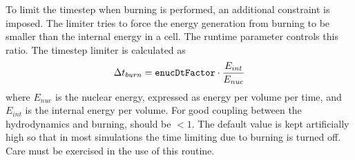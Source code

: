 To limit the timestep when burning is performed, an additional constraint is imposed.   The limiter tries to force the energy generation from burning to be smaller than the internal energy in a cell.  The runtime parameter  controls this ratio.  The timestep limiter is calculated as
\begin{equation}
\Delta t_{burn} = {\tt enucDtFactor} \cdot \frac{E_{int}}{E_{nuc}}
\end{equation}
where $E_{nuc}$ is the nuclear energy, expressed as energy per volume per time, and
$E_{int}$ is the internal energy per volume.
For good coupling between the hydrodynamics and burning,
 should be $< 1$. The default value is kept
artificially high so that in most simulations the time limiting due to
burning is turned off. Care must be exercised in the use of this routine.

